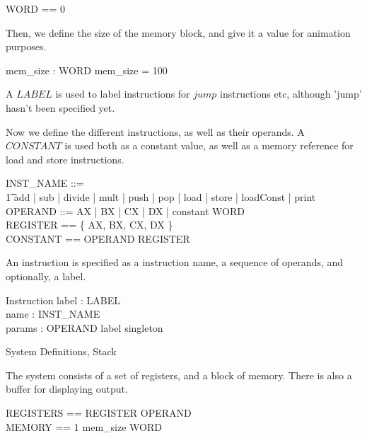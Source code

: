 \documentclass{article}
\begin{document}
\begin{zed}
  WORD == 0 
\end{zed}

Then, we define the size of the memory block, and give it a value for
animation purposes.

\begin{axdef}
  mem\_size : WORD
\where
  mem\_size = 100
\end{axdef}

A $LABEL$ is used to label instructions for $jump$ instructions etc,
although 'jump' hasn't been specified yet.

\begin{zed}
  [LABEL]
\end{zed}

Now we define the different instructions, as well as their operands. A
$CONSTANT$ is used both as a constant value, as well as a memory
reference for load and store instructions.

\begin{zed}
  INST\_NAME ::= \\
    \t1 add | sub | divide | mult | push | pop |
      load | store | loadConst | print \\
  OPERAND ::= AX | BX | CX | DX | constant \ldata WORD \rdata\\
  REGISTER == \{ AX, BX, CX, DX \}\\
  CONSTANT == OPERAND \setminus REGISTER
\end{zed}

An instruction is specified as a instruction name, a sequence of
operands, and optionally, a label.

\begin{schema}{Instruction}
  label : \power LABEL \\
  name : INST\_NAME \\
  params : \seq OPERAND
\where
  label \in singleton
\end{schema}

\begin{zsection}
  \SECTION System \parents Definitions, Stack
\end{zsection}

The system consists of a set of registers, and a block of
memory. There is also a buffer for displaying output.

\begin{zed}
  REGISTERS == REGISTER \fun OPERAND\\
  MEMORY == 1 \upto mem\_size \pfun WORD    
\end{zed}
\end{document}
